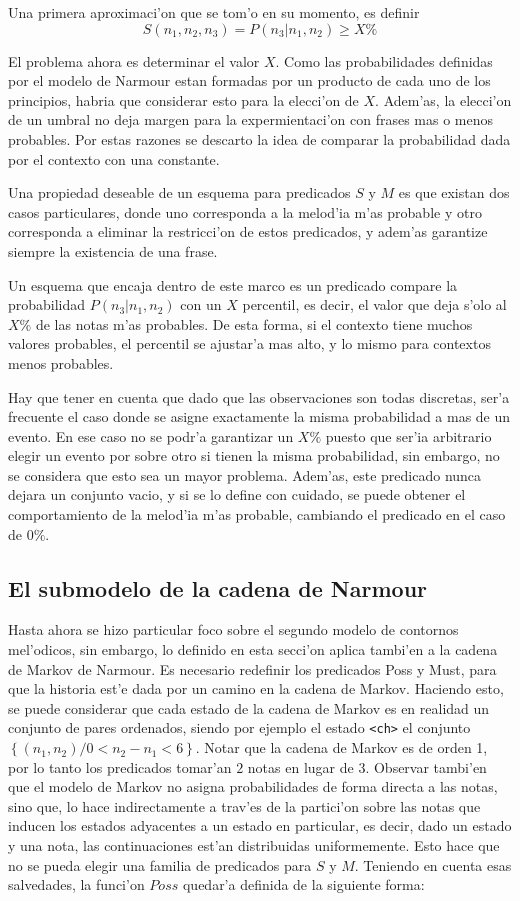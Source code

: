 Una primera aproximaci'on que se tom'o en su momento, es definir 
$$S(n_1, n_2, n_3) = P(n_3 | n_1, n_2) \geq X\%$$

El problema ahora es determinar
el valor $X$. Como las probabilidades definidas por el modelo de Narmour estan formadas por un producto de cada uno de los principios, habria 
que considerar esto para la elecci'on de $X$. Adem'as, la elecci'on de un umbral no deja margen para la expermientaci'on con frases
mas o menos probables. 
Por estas razones se descarto la idea de comparar la probabilidad dada por el contexto con una constante. 

Una propiedad deseable de un esquema para predicados $S$ y $M$ es que existan dos casos particulares, 
donde uno corresponda a la melod'ia m'as probable
y otro corresponda a eliminar la restricci'on de estos predicados, y adem'as garantize siempre la existencia de una frase. 

Un esquema que encaja dentro de este marco es un predicado compare la probabilidad $P(n_3 | n_1, n_2)$ con un 
$X$ percentil, es decir, el valor que deja s'olo al $X\%$ de las notas m'as probables.  De esta forma, si el contexto tiene muchos valores probables, 
el percentil se ajustar'a mas alto, y lo mismo para contextos menos probables.

Hay que tener en cuenta que dado que las observaciones son todas discretas, ser'a frecuente el caso donde 
se asigne exactamente la misma probabilidad a mas de un evento. En ese caso no se podr'a garantizar un $X\%$ puesto que ser'ia arbitrario
elegir un evento por sobre otro si tienen la misma probabilidad, sin embargo, no se considera que esto sea un mayor problema. Adem'as, este predicado nunca dejara un conjunto vacio, y si se lo define con cuidado, se puede obtener
el comportamiento de la melod'ia m'as probable, cambiando el predicado en el caso de $0\%$.

\subsection{El submodelo de la cadena de Narmour}
Hasta ahora se hizo particular foco sobre el segundo modelo de contornos mel'odicos, sin embargo, lo definido en esta secci'on aplica tambi'en
a la cadena de Markov de Narmour. Es necesario redefinir los predicados Poss y Must, para que la historia est'e dada por un camino en la cadena de 
Markov. 
Haciendo esto, se puede considerar que cada estado de la cadena de Markov es en realidad un conjunto de pares ordenados, siendo por ejemplo
el estado \texttt{<ch>} el conjunto $\left\{(n_1, n_2) / 0 < n_2 - n_1 < 6  \right\}$. 
Notar que la cadena de Markov es de orden 1, por lo tanto los predicados tomar'an $2$ notas en lugar de $3$. Observar tambi'en que el modelo de Markov no 
asigna probabilidades de forma directa a las notas, sino que, lo hace indirectamente a trav'es de la partici'on sobre las notas que inducen los estados
adyacentes a un estado en particular, es decir, dado un estado y una nota, las continuaciones est'an distribuidas uniformemente. 
Esto hace que no se pueda elegir una familia de predicados para $S$ y $M$. Teniendo en cuenta esas salvedades, la funci'on $Poss$ quedar'a definida
de la siguiente forma:

